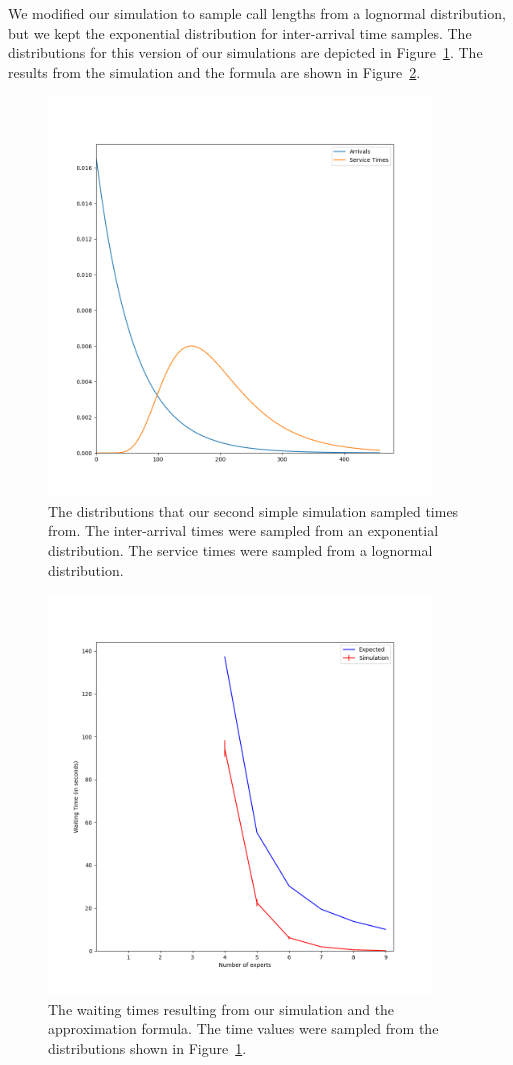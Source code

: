We modified our simulation to sample call lengths from a lognormal distribution,
but we kept the exponential distribution for inter-arrival time samples.
The distributions for this version of our simulations are depicted in
Figure~\ref{fig:simple_sim2_dists}.
The results from the simulation and the formula are shown in
Figure~\ref{fig:simple_sim2_results}.

\begin{figure}[h]
  \includegraphics[width=4in]{figures/montecarlo/expon_lognorm.png}
  \caption{
    The distributions that our second simple simulation sampled times from.
    The inter-arrival times were sampled from an exponential distribution.
    The service times were sampled from a lognormal distribution.
  }\label{fig:simple_sim2_dists}
\end{figure}

\begin{figure}[h]
  \includegraphics[width=4in]{figures/montecarlo/independent_calls_expon.png}
  \caption{
    The waiting times resulting from our simulation and the approximation
    formula.
    The time values were sampled from the distributions shown in
    Figure~\ref{fig:simple_sim2_dists}.
  }\label{fig:simple_sim2_results}
\end{figure}

